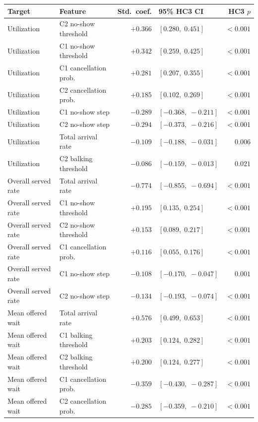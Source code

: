 \documentclass[11pt]{article}
\begin{document}
\begin{table}[H]
\centering
\small
\renewcommand{\arraystretch}{1.08}
\begin{tabular}{p{}p{}rp{}r}
\toprule
Target & Feature & Std.\ coef. & 95\% HC3 CI & HC3 $p$ \\
\midrule
Utilization & C2 no-show threshold & $+0.366$ & $[0.280,\;0.451]$ & $<0.001$ \\
Utilization & C1 no-show threshold & $+0.342$ & $[0.259,\;0.425]$ & $<0.001$ \\
Utilization & C1 cancellation prob. & $+0.281$ & $[0.207,\;0.355]$ & $<0.001$ \\
Utilization & C2 cancellation prob. & $+0.185$ & $[0.102,\;0.269]$ & $<0.001$ \\
Utilization & C1 no-show step & $-0.289$ & $[-0.368,\;-0.211]$ & $<0.001$ \\
Utilization & C2 no-show step & $-0.294$ & $[-0.373,\;-0.216]$ & $<0.001$ \\
Utilization & Total arrival rate & $-0.109$ & $[-0.188,\;-0.031]$ & $0.006$ \\
Utilization & C2 balking threshold & $-0.086$ & $[-0.159,\;-0.013]$ & $0.021$ \\
\midrule
Overall served rate & Total arrival rate & $-0.774$ & $[-0.855,\;-0.694]$ & $<0.001$ \\
Overall served rate & C1 no-show threshold & $+0.195$ & $[0.135,\;0.254]$ & $<0.001$ \\
Overall served rate & C2 no-show threshold & $+0.153$ & $[0.089,\;0.217]$ & $<0.001$ \\
Overall served rate & C1 cancellation prob. & $+0.116$ & $[0.055,\;0.176]$ & $<0.001$ \\
Overall served rate & C1 no-show step & $-0.108$ & $[-0.170,\;-0.047]$ & $0.001$ \\
Overall served rate & C2 no-show step & $-0.134$ & $[-0.193,\;-0.074]$ & $<0.001$ \\
\midrule
Mean offered wait & Total arrival rate & $+0.576$ & $[0.499,\;0.653]$ & $<0.001$ \\
Mean offered wait & C1 balking threshold & $+0.203$ & $[0.124,\;0.282]$ & $<0.001$ \\
Mean offered wait & C2 balking threshold & $+0.200$ & $[0.124,\;0.277]$ & $<0.001$ \\
Mean offered wait & C1 cancellation prob. & $-0.359$ & $[-0.430,\;-0.287]$ & $<0.001$ \\
Mean offered wait & C2 cancellation prob. & $-0.285$ & $[-0.359,\;-0.210]$ & $<0.001$ \\

\end{tabular}
\end{table}
\end{document}
